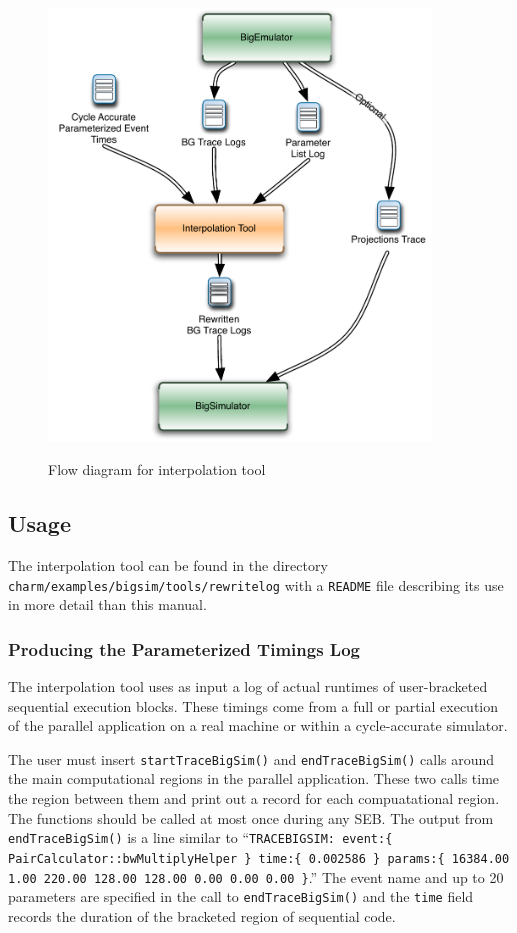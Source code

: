 \begin{figure}[!t]
\centering  
  \includegraphics[width=4in]{figures/InterpolationFlow}
{\sffamily\bfseries\small \caption{Flow diagram for interpolation tool\label{fig:interpolationflow}}}
\end{figure}

\subsection{Usage\label{usage}}

The interpolation tool can be found in the directory \texttt{charm/examples/bigsim/tools/rewritelog} with a \texttt{README} file describing its use in more detail than this manual.

\subsubsection{Producing the Parameterized Timings Log}
The interpolation tool uses as input a log of actual runtimes of user-bracketed sequential execution blocks. These timings come from a full or partial execution of the parallel application on a real machine or within a cycle-accurate simulator. 

The user must insert \texttt{startTraceBigSim()} and  \texttt{endTraceBigSim()} calls around the main computational regions in the parallel application. These two calls time the region between them and print out a record for each compuatational region. The functions should be called at most once during any SEB. The output from  \texttt{endTraceBigSim()} is a line similar to ``\texttt{TRACEBIGSIM: event:\{ PairCalculator::bwMultiplyHelper \}  time:\{ 0.002586 \}  params:\{ 16384.00 1.00 220.00 128.00 128.00 0.00 0.00 0.00 \}}.'' The event name and up to 20 parameters are specified in the call to  \texttt{endTraceBigSim()} and the \texttt{time} field records  the duration of the bracketed region of sequential code. 

